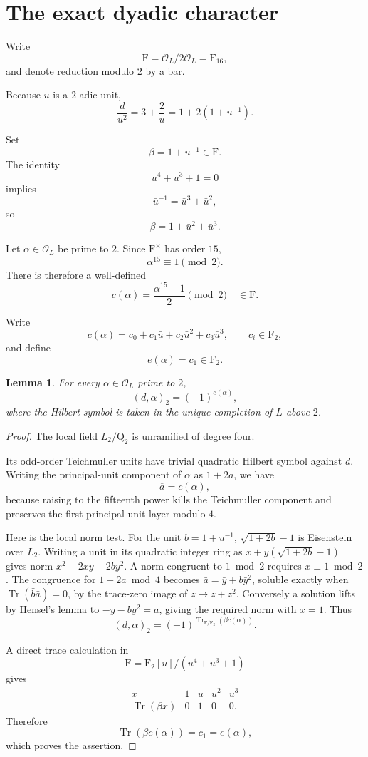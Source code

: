 \documentclass[11pt]{article}
\newtheorem{lemma}[theorem]{Lemma}
\newcommand{\Q}{\mathrm Q}
\newcommand{\F}{\mathrm F}
\newcommand{\Ocal}{\mathcal O}
\newcommand{\Tr}{\operatorname{Tr}}
\begin{document}
\section{The exact dyadic character}

Write
\[
\mathrm F=\Ocal_L/2\Ocal_L=\F_{16},
\]
and denote reduction modulo $2$
by a bar.

Because $u$ is a $2$-adic unit,
\[
\frac d{u^2}
=3+\frac2u
=1+2(1+u^{-1}).
\]

Set
\[
\beta=1+\bar u^{-1}\in\mathrm F.
\]
The identity
\[
\bar u^4+\bar u^3+1=0
\]
implies
\[
\bar u^{-1}=\bar u^3+\bar u^2,
\]
so
\[
\beta=1+\bar u^2+\bar u^3.
\]

Let $\alpha\in\Ocal_L$ be prime to $2$.
Since $\mathrm F^\times$ has order $15$,
\[
\alpha^{15}\equiv1\pmod2.
\]
There is therefore a well-defined
\[
c(\alpha)=
\frac{\alpha^{15}-1}{2}\pmod2
\quad\in\mathrm F.
\]

Write
\[
c(\alpha)=c_0+c_1\bar u+c_2\bar u^2
+c_3\bar u^3,
\qquad c_i\in\F_2,
\]
and define
\[
e(\alpha)=c_1\in\F_2.
\]

\begin{lemma}\label{lem:dyadic}
For every $\alpha\in\Ocal_L$ prime to $2$,
\[
(d,\alpha)_2=(-1)^{e(\alpha)},
\]
where the Hilbert symbol is taken in
the unique completion of $L$ above $2$.
\end{lemma}

\begin{proof}
The local field $L_2/\Q_2$ is unramified
of degree four.

Its odd-order Teichmuller units have trivial
quadratic Hilbert symbol against $d$.
Writing the principal-unit component
of $\alpha$ as $1+2a$, we have
\[
\overline a=c(\alpha),
\]
because raising to the fifteenth power
kills the Teichmuller component and
preserves the first principal-unit layer
modulo $4$.

Here is the local norm test. For the unit $b=1+u^{-1}$,
$\sqrt{1+2b}-1$ is Eisenstein over $L_2$.
Writing a unit in its quadratic integer ring as
$x+y(\sqrt{1+2b}-1)$ gives norm $x^2-2xy-2b y^2$.
A norm congruent to $1\bmod 2$ requires $x\equiv1\bmod2$.
The congruence for $1+2a\bmod4$ becomes
$\bar a=\bar y+\bar b\bar y^2$, soluble exactly when
$\Tr(\bar b\bar a)=0$, by the trace-zero image of $z\mapsto z+z^2$.
Conversely a solution lifts by Hensel's lemma to
$-y-by^2=a$, giving the required norm with $x=1$.
Thus
\[
(d,\alpha)_2
=(-1)^{\Tr_{\mathrm F/\F_2}
(\beta c(\alpha))}.
\]

A direct trace calculation in
\[
\mathrm F=\F_2[\bar u]/
(\bar u^4+\bar u^3+1)
\]
gives
\[
\begin{array}{c|cccc}
x&1&\bar u&\bar u^2&\bar u^3\\ \hline
\Tr(\beta x)&0&1&0&0.
\end{array}
\]
Therefore
\[
\Tr(\beta c(\alpha))=c_1=e(\alpha),
\]
which proves the assertion.
\end{proof}
\end{document}
